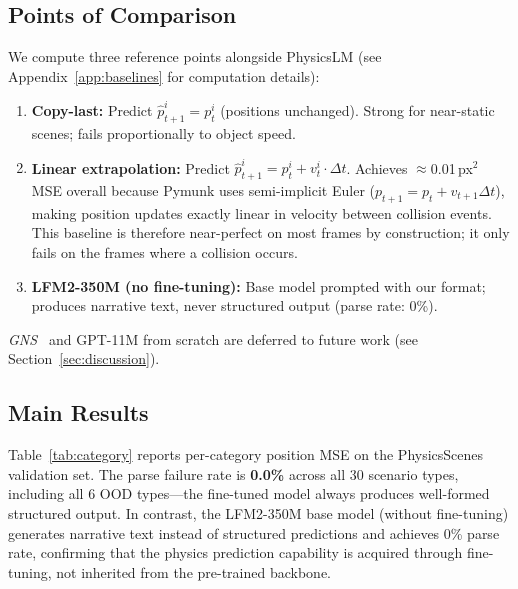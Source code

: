 \documentclass{article}
\begin{document}
\subsection{Points of Comparison}

We compute three reference points alongside PhysicsLM (see Appendix~\ref{app:baselines}
for computation details):

\begin{enumerate}[leftmargin=*,topsep=2pt,itemsep=0pt]
  \item \textbf{Copy-last:} Predict $\hat{p}^i_{t+1} = p^i_t$ (positions unchanged).
    Strong for near-static scenes; fails proportionally to object speed.
  \item \textbf{Linear extrapolation:} Predict $\hat{p}^i_{t+1} = p^i_t + v^i_t\!\cdot\!\Delta t$.
    Achieves $\approx$0.01\,px$^2$ MSE overall because Pymunk uses semi-implicit Euler
    ($p_{t+1} = p_t + v_{t+1}\Delta t$), making position updates exactly linear in
    velocity between collision events. This baseline is therefore near-perfect on
    most frames by construction; it only fails on the frames where a collision occurs.
  \item \textbf{LFM2-350M (no fine-tuning):} Base model prompted with our format;
    produces narrative text, never structured output (parse rate: 0\%).
\end{enumerate}

\noindent \emph{GNS~\citep{sanchez2020learning}} and GPT-11M from scratch are deferred
to future work (see Section~\ref{sec:discussion}).

\subsection{Main Results}
\label{sec:main-results}

Table~\ref{tab:category} reports per-category position MSE on the PhysicsScenes
validation set. The parse failure rate is \textbf{0.0\%} across all 30 scenario
types, including all 6 OOD types---the fine-tuned model always produces
well-formed structured output. In contrast, the LFM2-350M base model (without
fine-tuning) generates narrative text instead of structured predictions and
achieves 0\% parse rate, confirming that the physics prediction capability is
acquired through fine-tuning, not inherited from the pre-trained backbone.
\end{document}
